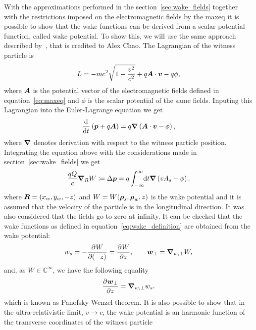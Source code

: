     With the approximations performed in the section~\ref{sec:wake_fields} together with the restrictions imposed on the electromagnetic fields by the \gls{maxeq} it is possible to show that the wake functions can be derived from a scalar potential function, called wake potential. To show this, we will use the same approach described by~, that is credited to Alex Chao. The Lagrangian of the witness particle is
    \begin{align}
  	  	L = -mc^2\sqrt{1 - \frac{v^2}{c^2}} + q\boldsymbol{A}\cdot\boldsymbol{v} - q\phi,
    \end{align}
    where $\boldsymbol{A}$ is the potential vector of the electromagnetic fields defined in equation~\eqref{eq:maxeq} and $\phi$ is the scalar potential of the same fields. Inputing this Lagrangian into the Euler-Lagrange equation we get
    \begin{align}
	  	\frac{\mathrm{d}^{{}}}{\mathrm{d} t^{{}}} \left(\boldsymbol{p} + q\boldsymbol{A}\right) = q\boldsymbol{\nabla}\left( \boldsymbol{A}\cdot\boldsymbol{v} - \phi\right),
    \end{align}
    where $\boldsymbol{\nabla}$ denotes derivation with respect to the witness particle position. Integrating the equation above with the considerations made in section~\ref{sec:wake_fields} we get
    \begin{align}
   		\frac{qQ}{c} \boldsymbol{\nabla}_R W \coloneqq \Delta\boldsymbol{p} = q\int_{-\infty}^{\infty}\!\!\text{d}t \boldsymbol{\nabla}\left(vA_s - \phi \right).
    \end{align}
    where $\boldsymbol{R} =(x_w, y_w, -z)$ and $W = W(\boldsymbol{\rho}_s, \boldsymbol{\rho}_w, z)$ is the wake potential and it is assumed that the velocity of the particle is in the longitudinal direction. It was also considered that the fields go to zero at infinity. It can be checked
    that the wake functions as defined in equation~\eqref{eq:wake_definition} are obtained from the wake potential:
    \begin{align}\label{eq:wake_from_potential}
   		w_s = - \frac{\partial^{{}}W}{\partial (-z)^{{}}} = \frac{\partial^{{}}W}{\partial z^{{}}},\qquad \boldsymbol{w}_\perp = \boldsymbol{\nabla}_{w,\perp} W,
    \end{align}
    and, as $W \in \mathbb{C}^{\infty}$, we have the following equality
    \begin{align}\label{eq:panofsky_wenzel_theorem}
   		\frac{\partial^{{}}\boldsymbol{w}_\perp}{\partial z^{{}}} = \boldsymbol{\nabla}_{w,\perp} w_s.
    \end{align}
    which is known as Panofsky-Wenzel theorem. It is also possible to show that in the ultra-relativistic limit, $v \to c$, the wake potential is an harmonic function of the transverse coordinates of the witness particle~\cite{Stupakov2000a}
